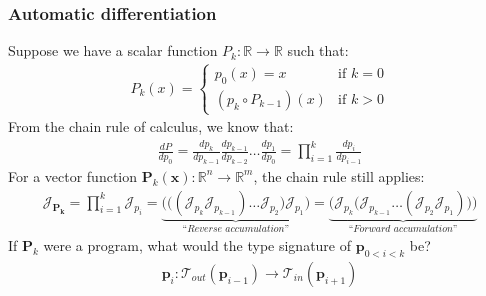 \documentclass{beamer}
\begin{document}
    \begin{frame}
        \frametitle{Automatic differentiation}
        Suppose we have a scalar function $P_k: \mathbb{R}\rightarrow\mathbb{R}$ such that:
        \begin{align*}
            P_k(x) = \begin{cases} p_0(x) = x &\text{if } k=0\\ (p_k\circ P_{k-1})(x)&\text{if } k > 0 \end{cases}
        \end{align*}
        From the chain rule of calculus, we know that:
        \begin{align*}
            \frac{dP}{dp_0} = \frac{dp_k}{dp_{k-1}}\frac{dp_{k-1}}{dp_{k-2}}\dots\frac{dp_1}{dp_0}= {\displaystyle \prod_{i=1}^{k} \frac{dp_{i}}{dp_{i-1}}}
        \end{align*}
        For a vector function $\mathbf{P}_k(\mathbf{x}): \mathbb{R}^n\rightarrow\mathbb{R}^m$, the chain rule still applies:
        \begin{align*}
            \mathcal{J}_\mathbf{P_k} = \displaystyle \prod_{i=1}^{k} \mathcal{J}_{p_i} = \underbrace{\bigg(\Big((\mathcal{J}_{p_k} \mathcal{J}_{p_{k-1}}) \dots \mathcal{J}_{p_2}\Big) \mathcal{J}_{p_1}\bigg)}_{\textit{``Reverse accumulation''}} = \underbrace{\bigg(\mathcal{J}_{p_k} \Big(\mathcal{J}_{p_{k-1}} \dots (\mathcal{J}_{p_2} \mathcal{J}_{p_1})\Big)\bigg)}_{\textit{``Forward accumulation''}}
        \end{align*}
        If $\mathbf{P}_{k}$ were a program, what would the type signature of $\mathbf{p}_{0<i<k}$ be?
        \begin{align*}
            \mathbf{p}_i: \mathcal{T}_{out}(\mathbf{p}_{i-1}) \rightarrow \mathcal{T}_{in}(\mathbf{p}_{i+1})
        \end{align*}
    \end{frame}

\end{document}
